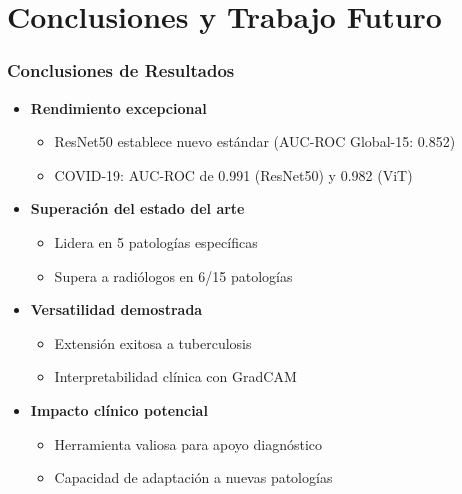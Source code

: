 
\section{Conclusiones y Trabajo Futuro}

\begin{frame}
\frametitle{Conclusiones de Resultados}
\begin{itemize}
    \item \textbf{Rendimiento excepcional}
    \begin{itemize}
        \item ResNet50 establece nuevo estándar (AUC-ROC Global-15: 0.852)
        \item COVID-19: AUC-ROC de 0.991 (ResNet50) y 0.982 (ViT)
    \end{itemize}
    \item \textbf{Superación del estado del arte}
    \begin{itemize}
        \item Lidera en 5 patologías específicas
        \item Supera a radiólogos en 6/15 patologías
    \end{itemize}
    \item \textbf{Versatilidad demostrada}
    \begin{itemize}
        \item Extensión exitosa a tuberculosis
        \item Interpretabilidad clínica con GradCAM
    \end{itemize}
    \item \textbf{Impacto clínico potencial}
    \begin{itemize}
        \item Herramienta valiosa para apoyo diagnóstico
        \item Capacidad de adaptación a nuevas patologías
    \end{itemize}
\end{itemize}
\end{frame}

